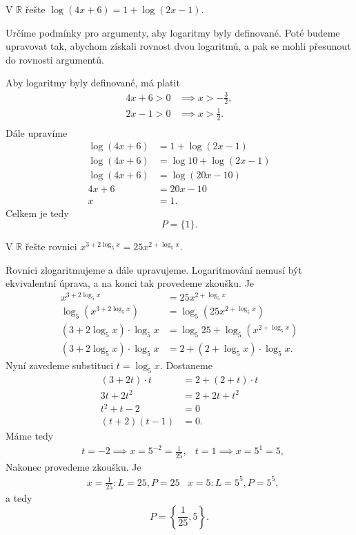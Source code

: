\begin{priklad}
V $\mathbb R$ řešte $\log (4x+6)=1+\log(2x-1).$
\end{priklad}

\begin{reseni}
Určíme podmínky pro argumenty, aby logaritmy byly definované. Poté budeme upravovat tak,
abychom získali rovnost dvou logaritmů, a pak se mohli přesunout do rovnosti argumentů.

Aby logaritmy byly definované, má platit
\begin{align*}
	4x+6 > 0 &\implies x > -\frac{3}{2},\\
	2x-1 >0 &\implies x >\frac{1}{2}.\\
\end{align*}
Dále upravíme
\begin{align*}
	\log(4x+6)&=1+\log(2x-1)\\
	\log(4x+6)&=\log 10 +\log(2x-1)\\
	\log(4x+6)&=\log(20x-10)\\
	4x+6 &= 20x -10\\
	x&=1.
\end{align*}
Celkem je tedy
$$
    P=\{1\}.
$$
\end{reseni}

\begin{priklad}
V $\mathbb R$ řešte rovnici $x^{3+2\log_5 x}=25x^{2+\log_5 x}$.
\end{priklad}

\begin{reseni}
Rovnici zlogaritmujeme a dále upravujeme. Logaritmování nemusí být ekvivalentní úprava, a na konci tak
provedeme zkoušku. Je
\begin{align*}
	x^{3+2\log_5 x}&=25x^{2+\log_5 x}\\
	\log_5(x^{3+2\log_5 x})&=\log_5(25x^{2+\log_5 x})\\
	(3+2\log_5 x)\cdot \log_5 x &= \log_5 25+\log_5(x^{2+\log_5 x})\\
	(3+2\log_5 x)\cdot \log_5 x &= 2 + (2+\log_5 x)\cdot \log_5 x.
\end{align*}
Nyní zavedeme substituci $t = \log_5 x$. Dostaneme
\begin{align*}
	(3+2t)\cdot t &= 2 + (2+t)\cdot t\\
	3t+2t^2 &= 2 + 2t + t^2\\
	t^2+t-2&=0\\
	(t+2)(t-1)&=0.
\end{align*}
Máme tedy
\begin{align*}
	&t=-2 \implies x = 5^{-2} = \frac{1}{25}, &t=1 \implies x = 5^1 = 5,
\end{align*}
Nakonec provedeme zkoušku. Je
\begin{align*}
	&x=\frac{1}{25}\colon L = 25, P = 25 &x=5\colon L = 5^5, P = 5^5,
\end{align*}
a tedy
$$P=\left\{\frac{1}{25}, 5\right\}.$$
\end{reseni}

